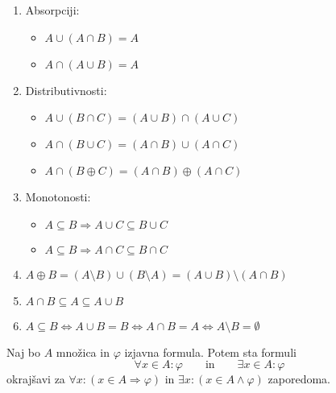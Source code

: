 \documentclass[12pt, a4paper]{article}
\renewcommand{\implies}{\Rightarrow}
\renewcommand{\iff}{\Leftrightarrow}
\begin{document}
\begin{izrek}
\begin{enumerate}[label=(\roman*)]
\item Absorpciji:

\vspace{-6pt}
\begin{multicols}{3}
\begin{itemize}
\item $A\cup(A\cap B)=A$
\item $A\cap(A\cup B)=A$
\end{itemize}
\end{multicols}
\vspace{-12pt}

\item Distributivnosti:

\begin{itemize}
\item $A\cup(B\cap C)=(A\cup B)\cap(A\cup C)$
\item $A\cap(B\cup C)=(A\cap B)\cup(A\cap C)$
\item $A\cap(B\oplus C)=(A\cap B)\oplus(A\cap C)$
\end{itemize}

\item Monotonosti:

\vspace{-6pt}
\begin{multicols}{2}
\begin{itemize}
\item $A\subseteq B\implies A\cup C\subseteq B\cup C$
\item $A\subseteq B\implies A\cap C\subseteq B\cap C$
\end{itemize}
\end{multicols}
\vspace{-12pt}

\item $A\oplus B=(A\setminus B)\cup(B\setminus A)=(A\cup B)\setminus(A\cap B)$
\item $A\cap B\subseteq A\subseteq A\cup B$
\item $A\subseteq B\iff A\cup B=B\iff A\cap B=A\iff A\setminus B=\emptyset$
\end{enumerate}
\end{izrek}

\obvs

\begin{definicija}
Naj bo $A$ množica in $\varphi$ izjavna formula. Potem sta formuli
\[
\forall x\in A\colon\varphi\qquad\text{in}\qquad\exists x\in A\colon\varphi
\]
okrajšavi za $\forall x\colon(x\in A\implies\varphi)$ in $\exists x\colon(x\in A\land\varphi)$ zaporedoma.
\end{definicija}
\end{document}
